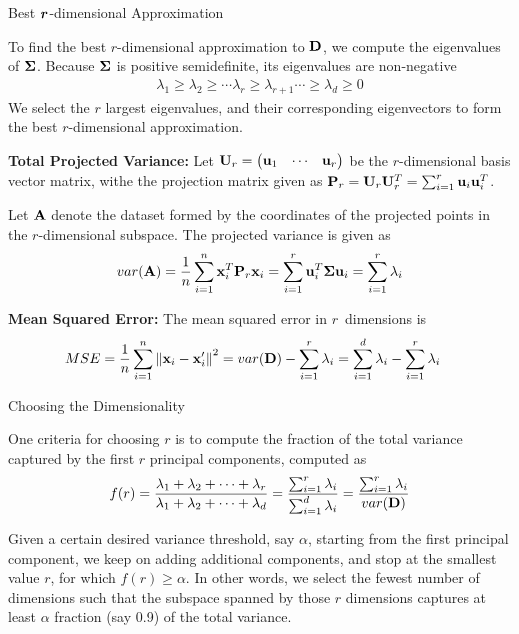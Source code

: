 


\begin{frame}{Best $\textbf{\textit{r}}$-dimensional Approximation}
  \small

To f\/{i}nd the best $r$-dimensional
approximation to $\mathbf{D}$,
we compute the eigenvalues of ${\bm \Sigma}$.
Because ${\bm \Sigma}$ is positive
  semidef\/{i}nite, its eigenvalues are non-negative
\begin{align*}
  \lambda_{1} \geq \lambda_{2} \geq \cdots \lambda_{r}\geq
  \lambda_{r+1} \cdots \geq \lambda_{d} \ge 0
\end{align*}
We select the $r$ largest eigenvalues, and their
corresponding eigenvectors to form the best $r$-dimensional
approximation.

\medskip
{\bf Total Projected Variance:}
Let $\mathbf{U}_r = \begin{pmatrix} \mathbf{u}_1 & \cdots & \mathbf{u}_r  \end{pmatrix}$ be the $r$-dimensional
basis vector matrix, withe the 
projection matrix given as
$\mathbf{P}_r = \mathbf{U}_r\mathbf{U}_r^T = \sum_{i=1}^r \mathbf{u}_i \mathbf{u}_i^T$.

\medskip
Let $\mathbf{A}$ denote the dataset formed by the coordinates of the
projected points in the \hbox{$r$-dimensional} subspace.
The projected variance is given as
\begin{align*}
    var(\mathbf{A}) = {1\over n} \sum_{i=1}^n \mathbf{x}_i^T\mathbf{P}_r\mathbf{x}_i =
    \sum_{i=1}^r \mathbf{u}_i^T {\bm \Sigma} \mathbf{u}_i = \sum_{i=1}^r \lambda_i
\end{align*}

\medskip
{\bf Mean Squared Error:}
The mean squared error in $r$~dimensions is
\begin{align*}
    MSE &= {1\over n} \sum_{i=1}^n \left\lVert\mathbf{x}_i -
    \mathbf{x}_i'\right\rVert^2 = 
    var(\mathbf{D}) - \sum_{i=1}^r \lambda_i = 
	\sum_{i=1}^d \lambda_i - \sum_{i=1}^r \lambda_i
\end{align*}
\end{frame}



\begin{frame}{Choosing the Dimensionality}

  One criteria for
choosing $r$ is to compute the fraction of the total variance
captured by the
f\/{i}rst $r$ principal components, computed as
\begin{align*}
  f(r) =
  \frac{\lambda_1+\lambda_2+\cdots+\lambda_r}
  {\lambda_1+\lambda_2+\cdots+\lambda_d}
  = \frac{\sum_{i=1}^r \lambda_i}{\sum_{i=1}^d \lambda_i}
  = \frac{\sum_{i=1}^r \lambda_i}{var(\mathbf{D})}
  \label{eq:eda:dimr:fracvar}
\end{align*}

Given a certain desired variance threshold, say $\alpha$,
starting from
the f\/{i}rst principal component, we keep on adding additional
components, and stop at the smallest value $r$,
for which $f(r) \geq \alpha$. In other words, we select the
fewest number of dimensions such that the subspace spanned by
those $r$ dimensions captures at least $\alpha$ fraction (say 0.9) 
of the
total variance.
\end{frame}


